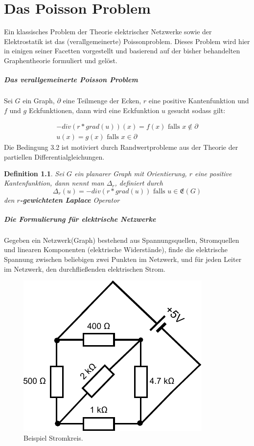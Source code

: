 \documentclass[11pt,a4paper,leqno]{report}
\newtheorem{definition}[theorem]{Definition}
\numberwithin{equation}{chapter}
\begin{document}
\chapter{Das Poisson Problem}
Ein klassisches Problem der Theorie elektrischer Netzwerke sowie der Elektrostatik ist das (verallgemeinerte) Poissonproblem. Dieses Problem wird hier in einigen seiner Facetten vorgestellt und basierend auf der bisher behandelten Graphentheorie formuliert und gel\"ost.
\paragraph{Das verallgemeinerte Poisson Problem}
Sei $G$ ein Graph, $\partial$ eine Teilmenge der Ecken, $r$ eine positive Kantenfunktion und $f$ und $g$ Eckfunktionen, dann wird eine Eckfunktion $u$ gesucht sodass gilt:

\begin{align}
	-div(r * grad(u))(x) = f(x)\text{  falls } x\notin \partial\\
	u(x) = g(x)\text{  falls } x\in \partial
\end{align}
Die Bedingung 3.2 ist motiviert durch Randwertprobleme aus der Theorie der partiellen Differential\-gleichungen.
\begin{definition}
	Sei $G$ ein planarer Graph mit Orientierung, $r$ eine positive Kantenfunktion, dann nennt man $\Delta_r$, definiert durch 
	$$\Delta_r(u) = -div(r * grad(u))\text{ falls }u\in\mathfrak{E}(G)$$
	den \textbf{$r$-gewichteten Laplace} Operator
\end{definition}
\paragraph{Die Formulierung f\"ur elektrische Netzwerke}Gegeben ein Netzwerk(Graph) bestehend aus Spannungsquellen, Stromquellen und linearen Komponenten (elektrische Widerst\"ande), finde  die elektrische Spannung zwischen beliebigen zwei Punkten im Netzwerk, und f\"ur jeden Leiter im Netzwerk, den durch\-flie\ss{}enden elektrischen Strom.
\begin{figure}[H]
	\begin{center}
		\includegraphics[scale=0.6]{Abbildungen/stromkreis_1.pdf}
		\caption{Beispiel Stromkreis.}
	\end{center}
\end{figure}
\noindent
\end{document}
